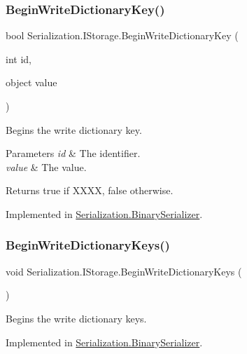 \subsubsection{\texorpdfstring{Begin\+Write\+Dictionary\+Key()}{BeginWriteDictionaryKey()}}
{\footnotesize\ttfamily bool Serialization.\+I\+Storage.\+Begin\+Write\+Dictionary\+Key (\begin{DoxyParamCaption}\item[{int}]{id,  }\item[{object}]{value }\end{DoxyParamCaption})}



Begins the write dictionary key. 


\begin{DoxyParams}{Parameters}
{\em id} & The identifier.\\
\hline
{\em value} & The value.\\
\hline
\end{DoxyParams}
\begin{DoxyReturn}{Returns}
{\ttfamily true} if X\+X\+XX, {\ttfamily false} otherwise.
\end{DoxyReturn}


Implemented in \hyperlink{class_serialization_1_1_binary_serializer_a07ccc4cc72e4c414f60de04ace5a6459}{Serialization.\+Binary\+Serializer}.

\mbox{\label{interface_serialization_1_1_i_storage_a06dcc7ec3a100509abc863136d0cd6f3}} 
\subsubsection{\texorpdfstring{Begin\+Write\+Dictionary\+Keys()}{BeginWriteDictionaryKeys()}}
{\footnotesize\ttfamily void Serialization.\+I\+Storage.\+Begin\+Write\+Dictionary\+Keys (\begin{DoxyParamCaption}{ }\end{DoxyParamCaption})}



Begins the write dictionary keys. 



Implemented in \hyperlink{class_serialization_1_1_binary_serializer_afb882e22e8a0215c525810ea8c2375d8}{Serialization.\+Binary\+Serializer}.


